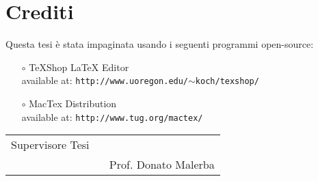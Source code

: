 \documentclass[final,a4paper]{book}
\begin{document}

\pagestyle{fancy}
\fancyhf{}
\fancyhead[RL]{\rightmark}
\fancyhead[LO]{\leftmark}
\fancyhead[LE,RO]{\small \thepage}

\renewcommand{\figurename}{\footnotesize\sc Figure\rm}
\renewcommand{\tablename}{\footnotesize\sc Table\rm}

\renewcommand{\chaptermark}[1]{\markboth{\sc\small #1}{}}
\renewcommand{\sectionmark}[1]{\markright{\sc\small \thesection\ #1}}

\newcommand\mytodo[1]{\textbf{\textcolor{red}{TODO: #1}}}

\newcommand*{\thead}[1]{\multicolumn{1}{c}{\bfseries #1}}



% 



\maketitle

\clearpage

\section*{Crediti}
Questa tesi \`e stata impaginata usando i seguenti programmi open-source:
\begin{itemize}
  \item [$\circ$] TeXShop LaTeX Editor \\
	available at: {\tt http://www.uoregon.edu/$\sim$koch/texshop/}
  \item [$\circ$] MacTex Distribution \\
	available at: {\tt http://www.tug.org/mactex/}
\end{itemize}
\vspace*{\fill}


\noindent
\begin{tabular}{p{185pt} p{110pt}}
Supervisore Tesi \hskip 3cm \ & \\ \cline{2-2} & Prof. Donato Malerba \\
\end{tabular}

\vspace{2cm}
\end{document}
